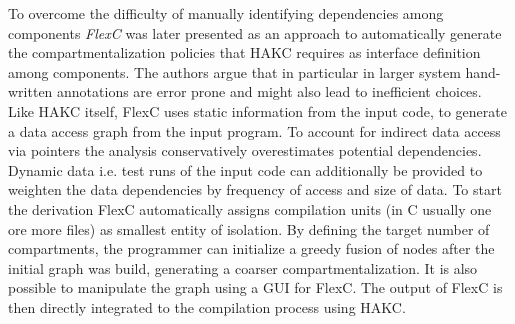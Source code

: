 To overcome the difficulty of manually identifying dependencies among components \emph{FlexC}\cite{mckee2022novel} was later presented as an approach to automatically generate the compartmentalization policies that HAKC requires as interface definition among components. The authors argue that in particular in larger system hand-written annotations are error prone and might also lead to inefficient choices. Like HAKC itself, FlexC uses static information from the input code, to generate a data access graph from the input program. To account for indirect data access via pointers the analysis conservatively overestimates potential dependencies. Dynamic data i.e. test runs of the input code can additionally be provided to weighten the data dependencies by frequency of access and size of data. To start the derivation FlexC automatically assigns compilation units (in C usually one ore more files) as smallest entity of isolation. By defining the target number of compartments, the programmer can initialize a greedy fusion of nodes after the initial graph was build, generating a coarser compartmentalization. It is also possible to manipulate the graph using a GUI for FlexC. The output of FlexC is then directly integrated to the compilation process using HAKC. \\

